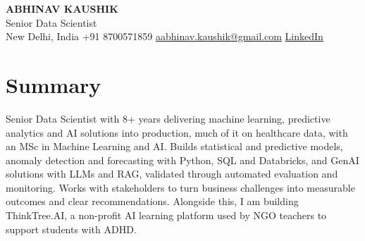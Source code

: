 \documentclass[10pt,a4paper]{article}
\begin{document}
\begin{center}
  {\LARGE\bfseries ABHINAV KAUSHIK}\\[2pt]
  {\large Senior Data Scientist}\\[2pt]
  New Delhi, India \textbar{} +91 8700571859 \textbar{} \href{mailto:aabhinav.kaushik@gmail.com}{aabhinav.kaushik@gmail.com} \textbar{} \href{https://www.linkedin.com/in/abhinav-kaushik10/}{LinkedIn}  
\end{center}

\section{Summary}
Senior Data Scientist with 8+ years delivering machine learning, predictive analytics and AI solutions into production, much of it on healthcare data, with an MSc in Machine Learning and AI. Builds statistical and predictive models, anomaly detection and forecasting with Python, SQL and Databricks, and GenAI solutions with LLMs and RAG, validated through automated evaluation and monitoring. Works with stakeholders to turn business challenges into measurable outcomes and clear recommendations. Alongside this, I am building ThinkTree.AI, a non-profit AI learning platform used by NGO teachers to support students with ADHD.
\end{document}
